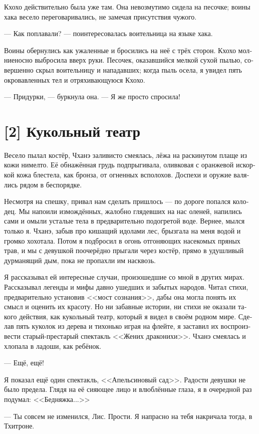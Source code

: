 \documentclass[a4paper,12pt,fleqn]{book}\usepackage{polyglossia}\setdefaultlanguage[babelshorthands=true]{russian}\setotherlanguage{english}\defaultfontfeatures{Ligatures=TeX,Mapping=tex-text}\usepackage{xcolor}\newcommand{\ml}[3]{#2}
\begin{document}
{Кхохо действительно была уже там.
Она невозмутимо сидела на песочке;
воины хака весело переговаривались, не замечая присутствия чужого.

--- Как поплавали? --- поинтересовалась воительница на языке хака.

Воины обернулись как ужаленные и бросились на неё с трёх сторон.
Кхохо молниеносно выбросила вверх руки.
Песочек, оказавшийся мелкой сухой пылью, совершенно скрыл воительницу и нападавших;
когда пыль осела, я увидел пять окровавленных тел и отряхивающуюся Кхохо.

--- Придурки, --- буркнула она.
--- Я же просто спросила!

\section{[2] Кукольный театр}

Весело пылал костёр, Чханэ заливисто смеялась, лёжа на раскинутом плаще из кожи нимелто.
Её обнажённая грудь подпрыгивала, оливковая с оранжевой искоркой кожа блестела, как бронза, от огненных всполохов.
Доспехи и оружие валялись рядом в беспорядке.

Несмотря на спешку, привал нам сделать пришлось --- по дороге попался колодец.
Мы напоили измождённых, жалобно глядевших на нас оленей, напились сами и омыли усталые тела в предварительно подогретой воде.
Вернее, мылся только я.
Чханэ, забыв про кишащий идолами лес, брызгала на меня водой и громко хохотала.
Потом я подбросил в огонь отгоняющих насекомых пряных трав, и мы с девушкой поочерёдно прыгали через костёр, прямо в удушливый дурманящий дым, пока не пропахли им насквозь.

Я рассказывал ей интересные случаи, произошедшие со мной в других мирах.
Рассказывал легенды и мифы давно ушедших и забытых народов.
Читал стихи, предварительно установив <<мост сознания>>, дабы она могла понять их смысл и оценить их красоту.
Но ни забавные истории, ни стихи не оказали такого действия, как кукольный театр, который я видел в своём родном мире.
Сделав пять куколок из дерева и тихонько играя на флейте, я заставил их воспроизвести старый-престарый спектакль <<Жених драконихи>>.
Чханэ смеялась и хлопала в ладоши, как ребёнок.

--- Ещё, ещё!

Я показал ещё один спектакль, <<Апельсиновый сад>>.
Радости девушки не было предела.
Глядя на её сияющее лицо и влюблённые глаза, я в очередной раз подумал: <<Бедняжка...>>

--- Ты совсем не изменился, Лис.
Прости.
Я напрасно на тебя накричала тогда, в Тхитроне.

}
\end{document}
